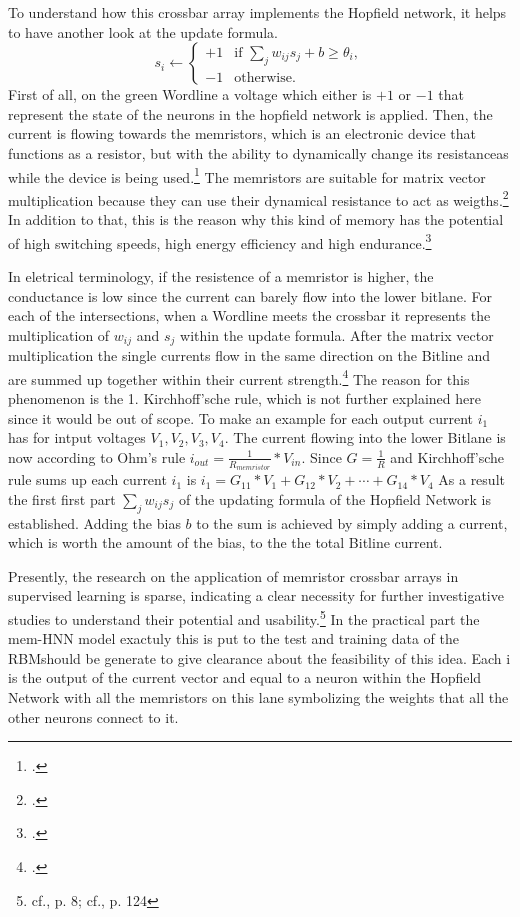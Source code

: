 To understand how this crossbar array implements the Hopfield network, it helps to have another look at the update formula.
\[
s_i \leftarrow 
\begin{cases} 
+1 & \text{if } \sum_j w_{ij} s_j + b \geq \theta_i, \\
-1 & \text{otherwise}.
\end{cases}
\]
First of all, on the green Wordline a voltage which either is \( +1 \) or \( -1 \) that represent the state of the neurons in the hopfield network is applied.
Then, the current is flowing towards the memristors, which is an electronic device that functions as a resistor, but with the ability to dynamically change its resistanceas while the device is being used.\footcite[cf][124]{sungPerspectiveReviewMemristive2018}
The memristors are suitable for matrix vector multiplication because they can use their dynamical resistance to act as weigths.\footcite[cf][124]{sungPerspectiveReviewMemristive2018}
In addition to that, this is the reason why this kind of memory has the potential of high switching speeds, high energy efficiency and high endurance.\footcite[cf.][3]{amirsoleimaniInMemoryVectorMatrixMultiplication2020}

In eletrical terminology, if the resistence of a memristor is higher, the conductance is low since the current can barely flow into the lower bitlane.
For each of the intersections, when a Wordline meets the crossbar it represents the multiplication of \(w_{ij}\) and \(s_j\) within the update formula.
After the matrix vector multiplication the single currents flow in the same direction on the Bitline and are summed up together within their current strength.\footcite[cf.][3]{amirsoleimaniInMemoryVectorMatrixMultiplication2020}
The reason for this phenomenon is the 1. Kirchhoff'sche rule, which is not further explained here since it would be out of scope.
To make an example for each output current \(i_{1}\) has for intput voltages \(V_{1}, V_{2}, V_{3}, V_{4}\).
The current flowing into the lower Bitlane is now according to Ohm's rule \( i_{out} = \frac{1}{R_{memristor}} * V_{in}\).
Since \( G = \frac{1}{R}\) and Kirchhoff'sche rule sums up each current \(i_{1}\) is \( i_{1} = G_{11}*V_1 + G_{12}*V_2 + \cdots + G_{14}*V_4\)
As a result the first first part \(\sum_j w_{ij} s_j\) of the updating formula of the Hopfield Network is established.
Adding the bias \(b\) to the sum is achieved by simply adding a current, which is worth the amount of the bias, to the the total Bitline current.


Presently, the research on the application of memristor crossbar arrays in supervised learning is sparse, indicating a clear necessity for further investigative studies to understand their potential and usability.\footnote{cf.\cite{amirsoleimaniInMemoryVectorMatrixMultiplication2020}, p. 8; cf.\cite{sungPerspectiveReviewMemristive2018}, p. 124}
In the practical part the \ac{mem-HNN} model exactuly this is put to the test and training data of the \ac{RBM}should be generate to give clearance about the feasibility of this idea.
Each i is the output of the current vector and equal to a neuron within the Hopfield Network with all the memristors on this lane symbolizing the weights that all the other neurons connect to it.


